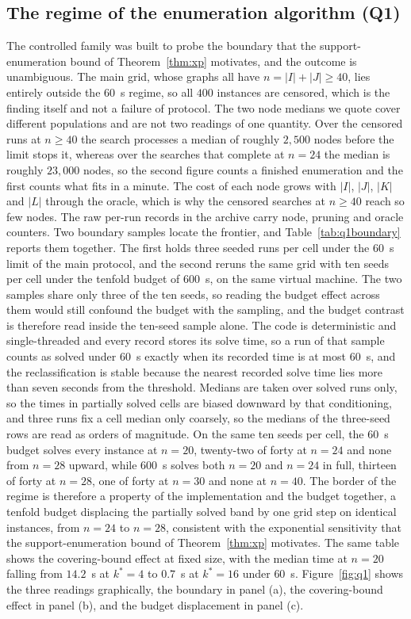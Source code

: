 \subsection{The regime of the enumeration algorithm (Q1)}
\label{sec:exp-q1}

The controlled family was built to probe the boundary that the
support-enumeration bound of Theorem~\ref{thm:xp} motivates, and the
outcome is unambiguous. The main grid, whose
graphs all have $n=|I|+|J|\ge 40$, lies entirely outside the $60$~s regime, so
all $400$ instances are censored, which is the finding itself and not
a failure of protocol. The two node medians we quote cover different
populations and are not two readings of one quantity. Over the censored
runs at $n\ge 40$ the search processes a median of roughly $2{,}500$
nodes before the limit stops it, whereas over the searches that
complete at $n=24$ the median is roughly $23{,}000$ nodes, so the second
figure counts a finished enumeration and the first counts what fits in
a minute. The cost of each node
grows with $|I|$, $|J|$, $|K|$ and $|L|$ through the oracle, which is
why the censored searches at $n\ge40$ reach so few nodes. The raw
per-run records in the archive carry node, pruning and oracle
counters. Two boundary samples locate the frontier, and
Table~\ref{tab:q1boundary} reports them together. The first holds
three seeded runs per cell under the $60$~s limit of the main protocol,
and the second reruns the same grid with ten seeds per cell under
the tenfold budget of $600$~s, on the same virtual machine. The two
samples share only three of the ten seeds, so reading the budget effect
across them would still confound the budget with the sampling, and the budget contrast is
therefore read inside the ten-seed sample alone. The code is
deterministic and single-threaded and every record stores its solve
time, so a run of that sample counts as solved under $60$~s exactly
when its recorded time is at most $60$~s, and the reclassification is
stable because the nearest recorded solve time lies more than seven
seconds from the threshold. Medians are taken over solved runs only, so
the times in partially solved cells are biased downward by that
conditioning, and three runs fix a cell median only coarsely, so the
medians of the three-seed rows are read as orders of magnitude. On the
same ten seeds per cell, the $60$~s budget solves every instance at
$n=20$, twenty-two of forty at $n=24$ and none from $n=28$ upward,
while $600$~s solves both $n=20$ and $n=24$ in full, thirteen of forty
at $n=28$, one of forty at $n=30$ and none at $n=40$. The border of the
regime is therefore a property of the implementation and the budget
together, a tenfold budget displacing the partially solved band by one
grid step on identical instances, from $n=24$ to $n=28$, consistent
with the exponential sensitivity that the support-enumeration bound of
Theorem~\ref{thm:xp} motivates. The same table shows the
covering-bound effect at fixed size, with the median time at $n=20$
falling from $14.2$~s at $k^\ast=4$ to $0.7$~s at $k^\ast=16$ under
$60$~s. Figure~\ref{fig:q1} shows the three readings graphically, the
boundary in panel (a), the covering-bound effect in panel (b), and the
budget displacement in panel (c).

